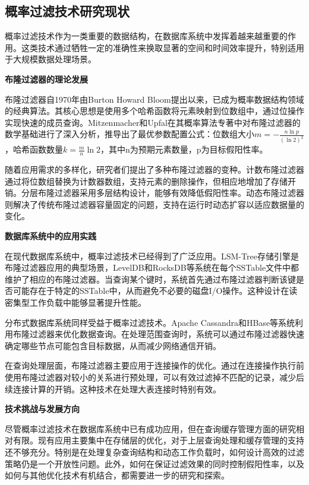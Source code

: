 \subsection{概率过滤技术研究现状}

概率过滤技术作为一类重要的数据结构，在数据库系统中发挥着越来越重要的作用。这类技术通过牺牲一定的准确性来换取显著的空间和时间效率提升，特别适用于大规模数据处理场景。

\textbf{布隆过滤器的理论发展}

布隆过滤器自1970年由Burton Howard Bloom提出以来\cite{c9}，已成为概率数据结构领域的经典算法。其核心思想是使用多个哈希函数将元素映射到位数组中，通过位操作实现快速的成员查询。Mitzenmacher和Upfal在其概率算法专著中对布隆过滤器的数学基础进行了深入分析\cite{c10}，推导出了最优参数配置公式：位数组大小$m = -\frac{n \ln p}{(\ln 2)^2}$，哈希函数数量$k = \frac{m}{n} \ln 2$，其中n为预期元素数量，p为目标假阳性率。

随着应用需求的多样化，研究者们提出了多种布隆过滤器的变种。计数布隆过滤器通过将位数组替换为计数器数组，支持元素的删除操作，但相应地增加了存储开销\cite{c12}。分层布隆过滤器采用多层结构设计，能够有效降低假阳性率。动态布隆过滤器则解决了传统布隆过滤器容量固定的问题，支持在运行时动态扩容以适应数据量的变化\cite{c13}。

\textbf{数据库系统中的应用实践}

在现代数据库系统中，概率过滤技术已经得到了广泛应用。LSM-Tree存储引擎是布隆过滤器应用的典型场景，LevelDB和RocksDB等系统在每个SSTable文件中都维护了相应的布隆过滤器\cite{c15}。当查询某个键时，系统首先通过布隆过滤器判断该键是否可能存在于特定的SSTable中，从而避免不必要的磁盘I/O操作。这种设计在读密集型工作负载中能够显著提升性能。

分布式数据库系统同样受益于概率过滤技术。Apache Cassandra和HBase等系统利用布隆过滤器来优化数据查询。在处理范围查询时，系统可以通过布隆过滤器快速确定哪些节点可能包含目标数据，从而减少网络通信开销。

在查询处理层面，布隆过滤器主要应用于连接操作的优化。通过在连接操作执行前使用布隆过滤器对较小的关系进行预处理，可以有效过滤掉不匹配的记录，减少后续连接计算的开销\cite{c17}。这种技术在处理大表连接时特别有效。

\textbf{技术挑战与发展方向}

尽管概率过滤技术在数据库系统中已有成功应用，但在查询缓存管理方面的研究相对有限。现有应用主要集中在存储层的优化，对于上层查询处理和缓存管理的支持还不够充分。特别是在处理复杂查询结构和动态工作负载时，如何设计高效的过滤策略仍是一个开放性问题。此外，如何在保证过滤效果的同时控制假阳性率，以及如何与其他优化技术有机结合，都需要进一步的研究和探索。

